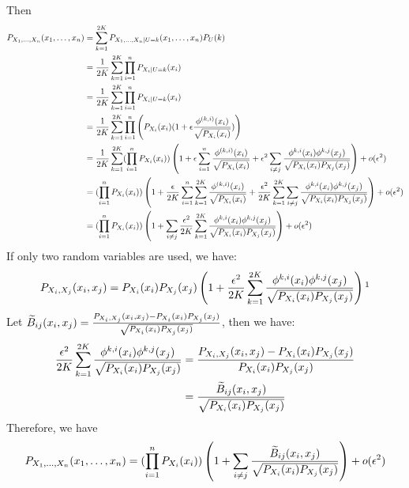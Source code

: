 \documentclass{article}
\begin{document}
Then
\begin{align*}
P_{X_1,\dots,X_n}(x_1,\dots,x_n)  &= \sum_{k=1}^{2K} P_{X_1,\dots,X_n | U=k}(x_1,\dots,x_n) P_U(k) \\
&= {1 \over 2K} \sum_{k=1}^{2K} \prod_{i=1}^n P_{X_i|U=k}(x_i)\\
&= {1 \over 2K} \sum_{k=1}^{2K} \prod_{i=1}^n P_{X_i|U=k}(x_i)\\
&= {1 \over 2K} \sum_{k=1}^{2K} \prod_{i=1}^n \left(P_{X_i} (x_i)( 1 + \epsilon {\phi^{(k,i)}(x_i ) \over \sqrt{P_{X_i}(x_i)}} )\right)\\
&= {1 \over 2K} \sum_{k=1}^{2K} (\prod_{i=1}^n  P_{X_i} (x_i))
\left( 1 + \epsilon\sum_{i=1}^n {\phi^{(k,i)}(x_i) \over \sqrt{P_{X_i}(x_i)}} + \epsilon^2\sum_{i\neq j}{\phi^{k,i}(x_i)\phi^{k,j}(x_j)\over \sqrt{P_{X_i}(x_i)P_{X_j}(x_j)} }\right)+o(\epsilon^2) \\
&= (\prod_{i=1}^n  P_{X_i} (x_i))
\left(1+{\epsilon\over 2K}\sum_{i=1}^n \sum_{k=1}^{2K}{\phi^{(k,i)}(x_i) \over \sqrt{P_{X_i}(x_i)}} +{\epsilon^2 \over 2K}\sum_{k=1}^{2K}\sum_{i\neq j}{\phi^{k,i}(x_i)\phi^{k,j}(x_j)\over \sqrt{P_{X_i}(x_i)P_{X_j}(x_j)} }\right) + o(\epsilon^2)\\
&= (\prod_{i=1}^n  P_{X_i} (x_i))
\left(1 +\sum_{i\neq j}{\epsilon^2 \over 2K}\sum_{k=1}^{2K}{\phi^{k,i}(x_i)\phi^{k,j}(x_j)\over \sqrt{P_{X_i}(x_i)P_{X_j}(x_j)} }\right) + o(\epsilon^2)
\end{align*}
If only two random variables are used, we have:
$$P_{X_i, X_j}(x_i, x_j) = P_{X_i}(x_i)P_{X_j}(x_j)\left(1+{\epsilon^2 \over 2K} \sum_{k=1}^{2K}{\phi^{k,i}(x_i)\phi^{k,j}(x_j)\over \sqrt{P_{X_i}(x_i)P_{X_j}(x_j)} } \right) \footnotemark$$
Let $\widetilde{B}_{ij}(x_i, x_j)={P_{X_i, X_j}(x_i,x_j) - P_{X_i}(x_i)P_{X_j}(x_j) \over \sqrt{P_{X_i}(x_i)P_{X_j}(x_j)}} $, then we have:
\begin{align*}
{\epsilon^2 \over 2K} \sum_{k=1}^{2K}{\phi^{k,i}(x_i)\phi^{k,j}(x_j)\over \sqrt{P_{X_i}(x_i)P_{X_j}(x_j)} } & = {P_{X_i, X_j}(x_i, x_j) - P_{X_i}(x_i)P_{X_j}(x_j) \over P_{X_i}(x_i)P_{X_j}(x_j)} \\
& = {\widetilde{B}_{ij}(x_i, x_j) \over \sqrt{P_{X_i}(x_i)P_{X_j}(x_j)} }
\end{align*}
Therefore, we have 
\begin{equation}
P_{X_1,\dots,X_n}(x_1,\dots,x_n) =  (\prod_{i=1}^n  P_{X_i} (x_i))\left ( 1 + \sum_{i\neq j}{\widetilde{B}_{ij}(x_i, x_j) \over \sqrt{P_{X_i}(x_i)P_{X_j}(x_j)} }\right) +o(\epsilon^2)
\end{equation}
\end{document}
